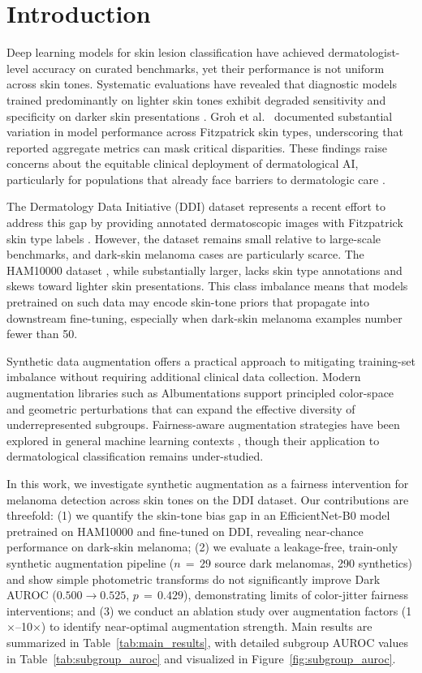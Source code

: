 \section{Introduction}

Deep learning models for skin lesion classification have achieved dermatologist-level accuracy on curated benchmarks, yet their performance is not uniform across skin tones. Systematic evaluations have revealed that diagnostic models trained predominantly on lighter skin tones exhibit degraded sensitivity and specificity on darker skin presentations \cite{Esteva2017, Daneshjou2022}. Groh et al.~\cite{Groh2021} documented substantial variation in model performance across Fitzpatrick skin types, underscoring that reported aggregate metrics can mask critical disparities. These findings raise concerns about the equitable clinical deployment of dermatological AI, particularly for populations that already face barriers to dermatologic care \cite{Adamson2018}.

The Dermatology Data Initiative (DDI) dataset represents a recent effort to address this gap by providing annotated dermatoscopic images \cite{Tan2019} with Fitzpatrick skin type labels \cite{Fitzpatrick1988}. However, the dataset remains small relative to large-scale benchmarks, and dark-skin melanoma cases are particularly scarce. The HAM10000 dataset \cite{Tschandl2018}, while substantially larger, lacks skin type annotations and skews toward lighter skin presentations. This class imbalance means that models pretrained on such data may encode skin-tone priors that propagate into downstream fine-tuning, especially when dark-skin melanoma examples number fewer than 50.

Synthetic data augmentation offers a practical approach to mitigating training-set imbalance without requiring additional clinical data collection. Modern augmentation libraries such as Albumentations \cite{Buslaev2020} support principled color-space and geometric perturbations that can expand the effective diversity of underrepresented subgroups. Fairness-aware augmentation strategies have been explored in general machine learning contexts \cite{Mehrabi2021}, though their application to dermatological classification remains under-studied.

In this work, we investigate synthetic augmentation as a fairness intervention for melanoma detection across skin tones on the DDI dataset. Our contributions are threefold: (1) we quantify the skin-tone bias gap in an EfficientNet-B0 model pretrained on HAM10000 and fine-tuned on DDI, revealing near-chance performance on dark-skin melanoma; (2) we evaluate a leakage-free, train-only synthetic augmentation pipeline ($n\,{=}\,29$ source dark melanomas, 290 synthetics) and show simple photometric transforms do not significantly improve Dark AUROC ($0.500 \to 0.525$, $p\,{=}\,0.429$), demonstrating limits of color-jitter fairness interventions; and (3) we conduct an ablation study over augmentation factors (1$\times$--10$\times$) to identify near-optimal augmentation strength. Main results are summarized in Table~\ref{tab:main_results}, with detailed subgroup AUROC values in Table~\ref{tab:subgroup_auroc} and visualized in Figure~\ref{fig:subgroup_auroc}.
